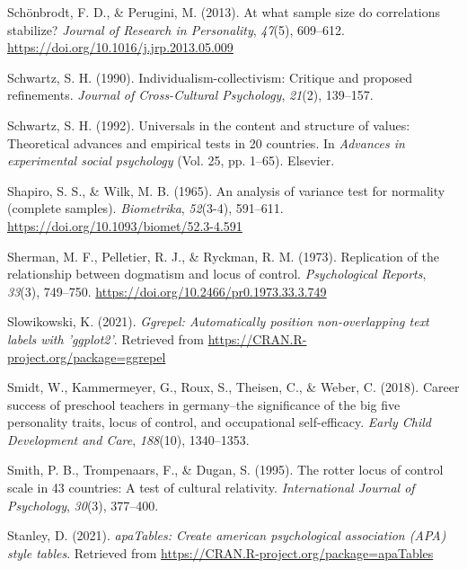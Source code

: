 \documentclass[
  english,
  man]{apa6}
\newlength{\cslhangindent}
\newlength{\cslentryspacingunit} %
\newenvironment{CSLReferences}[2] %
 {%
  \setlength{\parindent}{0pt}
  \ifodd #1
  \let\oldpar\par
  \def\par{\hangindent=\cslhangindent\oldpar}
  \fi
  \setlength{\parskip}{#2\cslentryspacingunit}
 }%
 {}
\begin{document}
\begin{CSLReferences}{1}{0}
\leavevmode{}%
Schönbrodt, F. D., \& Perugini, M. (2013). At what sample size do correlations stabilize? \emph{Journal of Research in Personality}, \emph{47}(5), 609--612. \url{https://doi.org/10.1016/j.jrp.2013.05.009}

\leavevmode{}%
Schwartz, S. H. (1990). Individualism-collectivism: Critique and proposed refinements. \emph{Journal of Cross-Cultural Psychology}, \emph{21}(2), 139--157.

\leavevmode{}%
Schwartz, S. H. (1992). Universals in the content and structure of values: Theoretical advances and empirical tests in 20 countries. In \emph{Advances in experimental social psychology} (Vol. 25, pp. 1--65). Elsevier.

\leavevmode{}%
Shapiro, S. S., \& Wilk, M. B. (1965). An analysis of variance test for normality (complete samples). \emph{Biometrika}, \emph{52}(3-4), 591--611. \url{https://doi.org/10.1093/biomet/52.3-4.591}

\leavevmode{}%
Sherman, M. F., Pelletier, R. J., \& Ryckman, R. M. (1973). Replication of the relationship between dogmatism and locus of control. \emph{Psychological Reports}, \emph{33}(3), 749--750. \url{https://doi.org/10.2466/pr0.1973.33.3.749}

\leavevmode{}%
Slowikowski, K. (2021). \emph{Ggrepel: Automatically position non-overlapping text labels with 'ggplot2'}. Retrieved from \url{https://CRAN.R-project.org/package=ggrepel}

\leavevmode{}%
Smidt, W., Kammermeyer, G., Roux, S., Theisen, C., \& Weber, C. (2018). Career success of preschool teachers in germany--the significance of the big five personality traits, locus of control, and occupational self-efficacy. \emph{Early Child Development and Care}, \emph{188}(10), 1340--1353.

\leavevmode{}%
Smith, P. B., Trompenaars, F., \& Dugan, S. (1995). The rotter locus of control scale in 43 countries: A test of cultural relativity. \emph{International Journal of Psychology}, \emph{30}(3), 377--400.

\leavevmode{}%
Stanley, D. (2021). \emph{apaTables: Create american psychological association (APA) style tables}. Retrieved from \url{https://CRAN.R-project.org/package=apaTables}


\end{CSLReferences}
\end{document}
